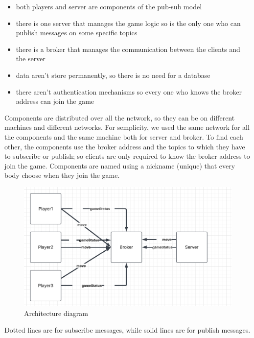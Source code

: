 \documentclass{scrartcl}
\begin{document}
  \begin{itemize}
    \item both players and server are components of the pub-sub model
    \item there is one server that manages the game logic so is the only one who can publish messages on some specific topics
    \item there is a broker that manages the communication between the clients and the server
    \item data aren't store permanently, so there is no need for a database 
    \item there aren't authentication mechanisms so every one who knows the broker address can join the game

  \end{itemize}
  Components are distributed over all the network, so they can be on different machines and different networks. For semplicity, we used the same network for all the components and the same machine both for server and broker. \newline
  To find each other, the components use the broker address and the topics to which they have to subscribe or publish; so clients are only required to know the broker address to join the game. \newline
  Components are named using a nickname (unique) that every body choose when they join the game.


\begin{figure}[H]
  \caption{Architecture diagram}
  \centering
  \includegraphics[scale=0.5]{figures/pubsubdiagram.png}
  \end{figure}

  Dotted lines are for subscribe messages, while solid lines are for publish messages. \newline
\end{document}
